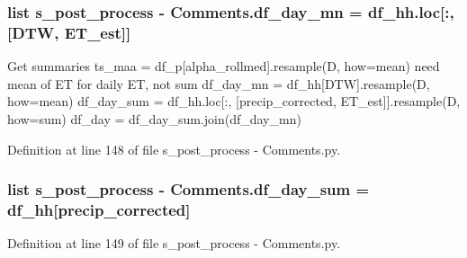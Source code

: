 \subsubsection[{df\+\_\+day\+\_\+mn}]{\setlength{\rightskip}{0pt plus 5cm}list s\+\_\+post\+\_\+process -\/ Comments.\+df\+\_\+day\+\_\+mn = df\+\_\+hh.\+loc\mbox{[}\+:, \mbox{[}\textquotesingle{}D\+T\+W\textquotesingle{}, \textquotesingle{}E\+T\+\_\+est\textquotesingle{}\mbox{]}\mbox{]}}\label{namespaces__post__process_01-_01_comments_a1b2d87778a264a8cbd089338b879c0ad}


Get summaries ts\+\_\+maa = df\+\_\+p\mbox{[}\textquotesingle{}alpha\+\_\+rollmed\textquotesingle{}\mbox{]}.resample(\textquotesingle{}D\textquotesingle{}, how=\textquotesingle{}mean\textquotesingle{}) need mean of E\+T for daily E\+T, not sum df\+\_\+day\+\_\+mn = df\+\_\+hh\mbox{[}\textquotesingle{}D\+T\+W\textquotesingle{}\mbox{]}.resample(\textquotesingle{}D\textquotesingle{}, how=\textquotesingle{}mean\textquotesingle{}) df\+\_\+day\+\_\+sum = df\+\_\+hh.\+loc\mbox{[}\+:, \mbox{[}\textquotesingle{}precip\+\_\+corrected\textquotesingle{}, \textquotesingle{}E\+T\+\_\+est\textquotesingle{}\mbox{]}\mbox{]}.resample(\textquotesingle{}D\textquotesingle{}, how=\textquotesingle{}sum\textquotesingle{}) df\+\_\+day = df\+\_\+day\+\_\+sum.\+join(df\+\_\+day\+\_\+mn) 



Definition at line 148 of file s\+\_\+post\+\_\+process -\/ Comments.\+py.

\hypertarget{namespaces__post__process_01-_01_comments_a171d51f6d9fd3e0e8100d8a932b24f3d}{}
\subsubsection[{df\+\_\+day\+\_\+sum}]{\setlength{\rightskip}{0pt plus 5cm}list s\+\_\+post\+\_\+process -\/ Comments.\+df\+\_\+day\+\_\+sum = {\bf df\+\_\+hh}\mbox{[}\textquotesingle{}precip\+\_\+corrected\textquotesingle{}\mbox{]}}\label{namespaces__post__process_01-_01_comments_a171d51f6d9fd3e0e8100d8a932b24f3d}


Definition at line 149 of file s\+\_\+post\+\_\+process -\/ Comments.\+py.

\hypertarget{namespaces__post__process_01-_01_comments_a799dd3cc5b8e24283cbce5d20d97168b}{}
